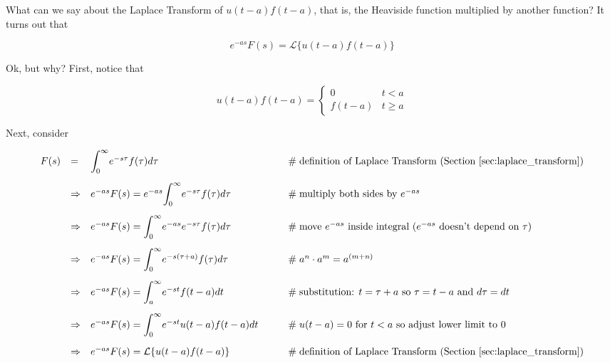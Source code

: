 \documentclass{article}
\theoremstyle{definition}
\begin{document}
\bigskip
\noindent
What can we say about the Laplace Transform of $u(t-a)f(t-a)$, that is, the Heaviside function multiplied by another function? It turns out that

\bigskip
\begin{equation*}
e^{-as} F(s) = \mathcal{L}\{u(t-a) f(t-a)\}
\label{eqn:lt_uf}
\end{equation*}


\bigskip
\noindent
Ok, but why? First, notice that

\bigskip
\begin{equation*}
u(t-a)f(t-a) =  
           \begin{cases} 
               0        & t < a  \\
               f(t-a)  & t \geq a
           \end{cases}
\end{equation*}

\bigskip
\noindent
Next, consider


\begin{equation*}
\begin{array}{lllll}
F(s)
&=& \mathlarger{\int}_0^\infty e^{-s\tau} f(\tau) d\tau                                                       &\qquad \mathrel{\#} \text{definition of Laplace Transform (Section \ref{sec:laplace_transform})}    \\
[15pt]
&\Rightarrow& e^{-as} F(s) = e^{-as} \mathlarger{\int}_0^\infty e^{-s\tau} f(\tau) d\tau    &\qquad \mathrel{\#} \text{multiply both sides by $e^{-as}$}                                                              \\
[15pt]
&\Rightarrow& e^{-as} F(s) = \mathlarger{\int}_0^\infty e^{-as} e^{-s\tau} f(\tau) d\tau    &\qquad \mathrel{\#} \text{move $e^{-as}$ inside integral ($e^{-as}$ doesn't depend on $\tau$)}    \\
[15pt]
&\Rightarrow& e^{-as} F(s) = \mathlarger{\int}_0^\infty e^{-s(\tau+a)} f(\tau) d\tau         &\qquad \mathrel{\#} a^n \cdot a^m = a^{(m+n)}                                                                                 \\
[15pt]
&\Rightarrow& e^{-as} F(s) = \mathlarger{\int}_a^\infty e^{-st} f(t-a) dt                           &\qquad \mathrel{\#} \text{substitution: $t = \tau + a$ so $\tau = t - a$ and $d\tau = dt$}                   \\
[15pt]
&\Rightarrow& e^{-as} F(s) = \mathlarger{\int}_0^\infty e^{-st} u(t-a) f(t-a) dt                 &\qquad \mathrel{\#} \text{$u(t-a) = 0$ for $t < a$ so adjust lower limit to 0}                                       \\
[15pt]
&\Rightarrow& e^{-as} F(s) = \mathcal{L}\{u(t-a) f(t-a)\}                                                 &\qquad \mathrel{\#} \text{definition of Laplace Transform (Section \ref{sec:laplace_transform})}       \\
\end{array}
\end{equation*}
\end{document}
